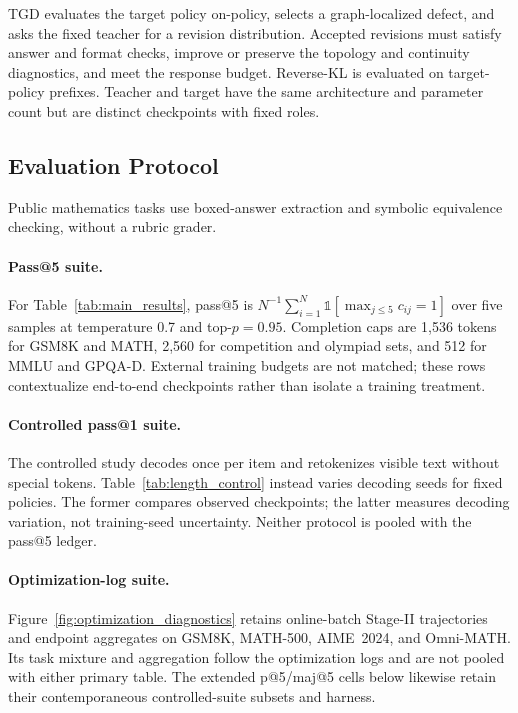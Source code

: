 TGD evaluates the target policy on-policy, selects a graph-localized defect, and asks the fixed teacher for a revision distribution. Accepted revisions must satisfy answer and format checks, improve or preserve the topology and continuity diagnostics, and meet the response budget. Reverse-KL is evaluated on target-policy prefixes. Teacher and target have the same architecture and parameter count but are distinct checkpoints with fixed roles.

\subsection{Evaluation Protocol}
Public mathematics tasks use boxed-answer extraction and symbolic equivalence checking, without a rubric grader.

\paragraph{Pass@5 suite.}
For Table~\ref{tab:main_results}, pass@5 is $N^{-1}\sum_{i=1}^{N}\mathds{1}[\max_{j\leq5}c_{ij}=1]$ over five samples at temperature 0.7 and top-$p=0.95$. Completion caps are 1{,}536 tokens for GSM8K and MATH, 2{,}560 for competition and olympiad sets, and 512 for MMLU and GPQA-D. External training budgets are not matched; these rows contextualize end-to-end checkpoints rather than isolate a training treatment.

\paragraph{Controlled pass@1 suite.}
The controlled study decodes once per item and retokenizes visible text without special tokens. Table~\ref{tab:length_control} instead varies decoding seeds for fixed policies. The former compares observed checkpoints; the latter measures decoding variation, not training-seed uncertainty. Neither protocol is pooled with the pass@5 ledger.

\paragraph{Optimization-log suite.}
Figure~\ref{fig:optimization_diagnostics} retains online-batch Stage-II trajectories and endpoint aggregates on GSM8K, MATH-500, AIME~2024, and Omni-MATH. Its task mixture and aggregation follow the optimization logs and are not pooled with either primary table. The extended p@5/maj@5 cells below likewise retain their contemporaneous controlled-suite subsets and harness.

